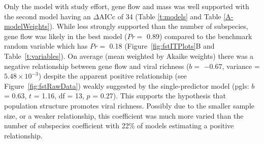 Only the model with study effort, gene flow and mass was well supported with the second model having an $\Delta\text{AICc}$ of 34 (Table \ref{t:models} and Table \ref{A-modelWeights}).
While less strongly supported than the number of subspecies, gene flow was likely in the best model ($Pr = $ 0.89) compared to the benchmark random variable which has $Pr = $ 0.18 (Figure~\ref{fig:fstITPlots}B and Table~\ref{t:variables}).
On average (mean weighted by Akaike weights) there was a negative relationship between gene flow and viral richness ($b = $ \ensuremath{-0.67}, variance = \ensuremath{5.48\times 10^{-3}}) despite the apparent positive relationship (see Figure~\ref{fig:fstRawData}) weakly suggested by the single-predictor model (pgls: $b$ = 0.63, $t$ = 1.16, df = 13, $p$ = 0.27).
This supports the hypothesis that population structure promotes viral richness.
Possibly due to the smaller sample size, or a weaker relationship, this coefficient was much more varied than the number of subspecies coefficient with 22\% of models estimating a positive relationship.


